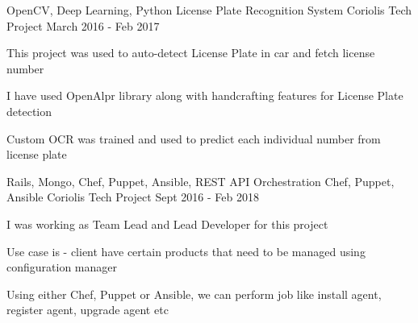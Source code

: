 \begin{cventries}
   \cventry
    {OpenCV, Deep Learning, Python} %
    {License Plate Recognition System} %
    {Coriolis Tech Project} %
    {March 2016 - Feb 2017} %
    {
      \begin{cvitems} %
        \item {This project was used to auto-detect License Plate in car and fetch license number}
        \item {I have used OpenAlpr library along with handcrafting features for License Plate detection}
        \item {Custom OCR was trained and used to predict each individual number from license plate}
      \end{cvitems}
    }

  \cventry
    {Rails, Mongo, Chef, Puppet, Ansible, REST API} %
    {Orchestration Chef, Puppet, Ansible} %
    {Coriolis Tech Project} %
    {Sept 2016 - Feb 2018} %
    {
      \begin{cvitems} %
        \item {I was working as Team Lead and Lead Developer for this project}
        \item {Use case is - client have certain products that need to be managed using configuration manager}
        \item {Using either Chef, Puppet or Ansible, we can perform job like install agent, register agent, upgrade agent etc}
      \end{cvitems}
    }



\end{cventries}
